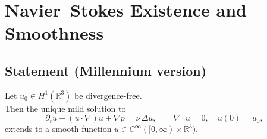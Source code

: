\chapter{Navier–Stokes Existence and Smoothness}

\section*{Statement (Millennium version)}
\begin{theorem}\label{NS:statement}
Let $u_{0}\in H^{1}(\mathbb R^{3})$ be divergence-free.  \\
Then the unique mild solution to
\[
\partial_{t} u + (u\!\cdot\!\nabla)u + \nabla p = \nu\,\Delta u,\qquad
\nabla\!\cdot u = 0,\quad u(0)=u_{0},
\]
extends to a smooth function $u\in C^{\infty}([0,\infty)\times\mathbb R^{3})$.
\end{theorem}

\bigskip







\appendix

